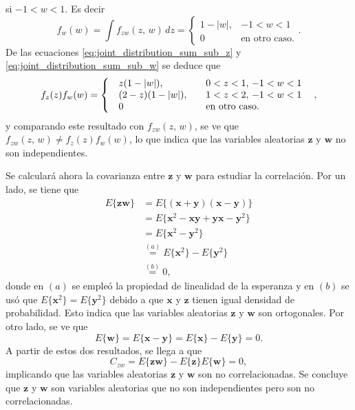 \documentclass[a4paper]{report}
\newcommand{\x}{\mathbf{x}}
\newcommand{\y}{\mathbf{y}}
\newcommand{\w}{\mathbf{w}}
\newcommand{\z}{\mathbf{z}}
\begin{document}
si \(-1<w<1\). Es decir
\begin{equation}\label{eq:joint_distribution_sum_sub_w}
f_w(w)=\int f_{zw}(z,\,w)\,dz
 =\left\{\begin{array}{ll}
   1-|w|, &  -1<w<1\\
   0 & \textrm{en otro caso.}
 \end{array} \right..
\end{equation}
De las ecuaciones \ref{eq:joint_distribution_sum_sub_z} y \ref{eq:joint_distribution_sum_sub_w} se deduce que
\[
 f_z(z)f_w(w)=
\arraycolsep=10pt
 \left\{\begin{array}{ll}
   z(1-|w|), &  0<z<1,\,-1<w<1\\
   (2-z)(1-|w|), & 1<z<2,\,-1<w<1\\
   0 & \textrm{en otro caso.}
 \end{array} \right., 
\]
y comparando este resultado con \(f_{zw}(z,\,w)\), se ve que \(f_{zw}(z,\,w)\neq f_z(z)f_w(w)\), lo que indica que las variables aleatorias \(\z\) y \(\w\) no son independientes.

Se calculará ahora la covarianza entre \(\z\) y \(\w\) para estudiar la correlación. Por un lado, se tiene que
\begin{align*}
 E\{\z\w\}&=E\{(\x+\y)(\x-\y)\}\\
   &=E\{\x^2-\x\y+\y\x-\y^2\}\\
   &=E\{\x^2-\y^2\}\\
   &\overset{(a)}{=}E\{\x^2\}-E\{\y^2\}\\
   &\overset{(b)}{=}0,
\end{align*}
donde en \((a)\) se empleó la propiedad de linealidad de la esperanza y en \((b)\) se usó que \(E\{\x^2\}=E\{\y^2\}\) debido a que \(\x\) y \(\z\) tienen igual densidad de probabilidad. Esto indica que las variables aleatorias \(\z\) y \(\w\) son ortogonales. Por otro lado, se ve que
\[
 E\{\w\}=E\{\x-\y\}=E\{\x\}-E\{\y\}=0.
\]
A partir de estos dos resultados, se llega a que
\[
 C_{zw}=E\{\z\w\}-E\{\z\}E\{\w\}=0,
\]
implicando que las variables aleatorias \(\z\) y \(\w\) son no correlacionadas. Se concluye que \(\z\) y \(\w\) son variables aleatorias que no son independientes pero son no correlacionadas.
\end{document}
